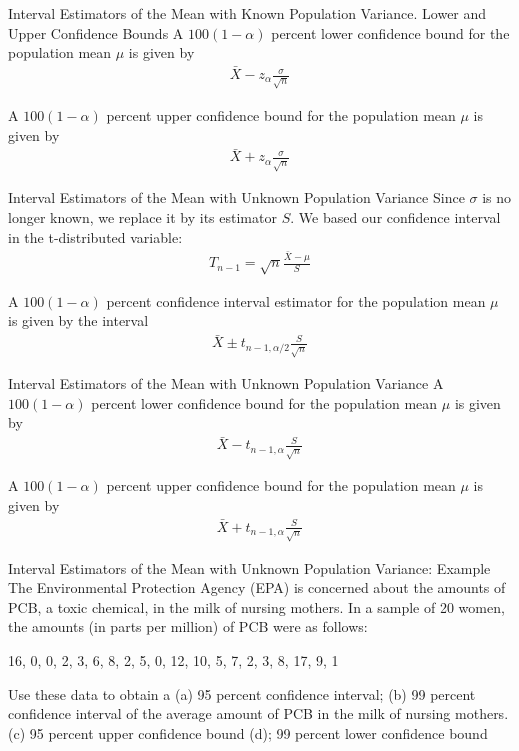 \documentclass{beamer}
\begin{document}
\begin{frame}{Interval Estimators of the Mean with Known
    Population Variance. Lower and Upper Confidence Bounds}
  A $100(1 - \alpha)$ percent lower confidence bound for the population mean
  $\mu$ is given by
  \begin{align*}
    \bar{X} - z_{\alpha}\frac{\sigma}{\sqrt{n}}
  \end{align*}

  A $100(1 - \alpha)$ percent upper confidence bound for the population mean
  $\mu$ is given by
  \begin{align*}
    \bar{X} + z_{\alpha}\frac{\sigma}{\sqrt{n}}
  \end{align*}
\end{frame}
\begin{frame}{Interval Estimators of the Mean with Unknown Population Variance}
  Since $\sigma$ is no longer known, we replace it by its estimator $S$. We
  based our confidence interval in the t-distributed variable:
  \begin{align*}
    T_{n-1} = \sqrt{n}\frac{\bar{X}-\mu}{S}
  \end{align*}

  A $100(1 - \alpha)$ percent confidence interval estimator for the population
  mean $\mu$ is given by the interval
  \begin{align*}
    \bar{X}\pm t_{n-1, \alpha/2}\frac{S}{\sqrt{n}}
  \end{align*}
\end{frame}

\begin{frame}{Interval Estimators of the Mean with Unknown Population Variance}
  A $100(1 - \alpha)$ percent lower confidence bound for the population mean
  $\mu$ is given by
  \begin{align*}
    \bar{X} - t_{n-1,\alpha}\frac{S}{\sqrt{n}}
  \end{align*}

  A $100(1 - \alpha)$ percent upper confidence bound for the population mean
  $\mu$ is given by
  \begin{align*}
    \bar{X} + t_{n-1,\alpha}\frac{S}{\sqrt{n}}
  \end{align*}
\end{frame}

\begin{frame}[t,shrink=10]{Interval Estimators of the Mean with Unknown Population
    Variance: Example}
  The Environmental Protection Agency (EPA) is concerned about the amounts of
  PCB, a toxic chemical, in the milk of nursing mothers. In a sample of 20
  women, the amounts (in parts per million) of PCB were as follows:
  \begin{center}
    16, 0, 0, 2, 3, 6, 8, 2, 5, 0, 12, 10, 5, 7, 2, 3, 8, 17, 9, 1
  \end{center}
  Use these data to obtain a (a) 95 percent confidence interval; (b) 99 percent
  confidence interval of the average amount of PCB in the milk of nursing
  mothers. (c) 95 percent upper confidence bound (d); 99 percent lower
  confidence bound
\end{frame}
\end{document}
